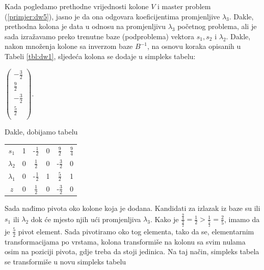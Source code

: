 \documentclass[a4paper, utf8, 11pt, colorlinks]{book}
\theoremstyle{definition}
\begin{document}
Kada pogledamo prethodne vrijednosti kolone $V$ i master problem (\ref{primjer:dw5}), jasno je da ona odgovara koeficijentima promjenljive $\lambda_3$. Dakle, prethodna kolona je data u odnosu na promjenljivu $\lambda_3$ početnog problema, ali je sada izražavamo preko trenutne baze (podproblema) vektora $s_1, s_2$ i $\lambda_2$. Dakle, nakon množenja kolone sa inverzom baze $B^{-1}$, na osnovu koraka opisanih u Tabeli \ref{tbl:dw1}, sljedeća kolona se dodaje u simpleks tabelu:

\begin{center}
 
  $\begin{pmatrix}
	 -\frac{3}{2}            \\
	 \frac{9}{2}     \\
 	-\frac{3}{2}       \\
	 \frac{5}{2}    \\
   \end{pmatrix}$.
\end{center}
Dakle, dobijamo tabelu 

\begin{center}
 
		\begin{tabular}{c|cccc|c}\vspace{1mm}
		   $s_1$	    &   1      &   -$\frac{1}{2}$         &   0         &   $\frac{9}{2}$          &  $\frac{9}{4}$ \\\vspace{1mm}
		   $\lambda_2$  &   0      &    $\frac{1}{2}$         &   0         &  -$ \frac{3}{2}$         &  0             \\\vspace{1mm}
		   $\lambda_1$  &   0      &    -$\frac{1}{2}$        &   1         &  $\frac{5}{2} $          &  1             \\ \hline\vspace{1mm}
		   $z$          &   0      &    $\frac{1}{2}$         &   0         &   -$\frac{3}{2}$       & 0  
	\end{tabular}
 
\end{center} 
Sada nađimo pivota oko kolone koja je dodana. Kandidati za izlazak iz baze su ili $s_1$ ili $\lambda_2$ dok će mjesto njih ući promjenljiva $\lambda_3$. Kako je $\frac{\frac94}{\frac92}=\frac{1}{2} > \frac{1}{\frac52}=\frac{2}{5}$, imamo da je $\frac{5}{2}$ pivot element. Sada pivotiramo oko tog elementa, tako da se, elementarnim transformacijama po vrstama, kolona transformiše  na kolonu sa svim nulama osim na poziciji pivota, gdje treba da stoji jedinica. Na taj način, simpleks tabela se transformiše u novu simpleks tabelu 
\end{document}
